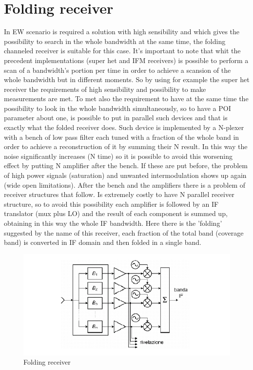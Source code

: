 \documentclass[12pt]{report}
\begin{document}
\section{Folding receiver}
In EW scenario is required a solution with high sensibility and which gives the possibility to search in the whole bandwidth at the same time, the folding channeled receiver is suitable for this case. It's important to note that whit the precedent implementations (super het and IFM receivers) is possible to perform a scan of a bandwidth's portion per time in order to achieve a scansion of the whole bandwidth but in different moments. So by using for example the super het receiver the requirements of high sensibility and possibility to make measurements are met. To met also the requirement to have at the same time the possibility to look in the whole bandwidth simultaneously, so to have a POI parameter about one, is possible to put in parallel such devices and that is exactly what the folded receiver does. Such device is implemented by a N-plexer with a bench of low pass filter each tuned with a fraction of the whole band in order to achieve a reconstruction of it by summing their N result. In this way the noise significantly increases (N time) so it is possible to avoid this worsening effect by putting N amplifier after the bench. If these are put before, the problem of high power signals (saturation) and unwanted intermodulation shows up again (wide open limitations). After the bench and the amplifiers there is a problem of receiver structures that follow. Is extremely costly to have N parallel receiver structure, so to avoid this possibility each amplifier is followed by an IF translator (mux plus LO) and the result of each component is summed up, obtaining in this way the whole IF bandwidth. Here there is the 'folding' suggested by the name of this receiver, each fraction of the total band (coverage band) is converted in IF domain and then folded in a single band. 

\begin{figure}[h!]
    \centering
    \includegraphics[width=12cm]{Pictures/channeled receiver.png}
    \caption{Folding receiver}
\end{figure}
\end{document}
